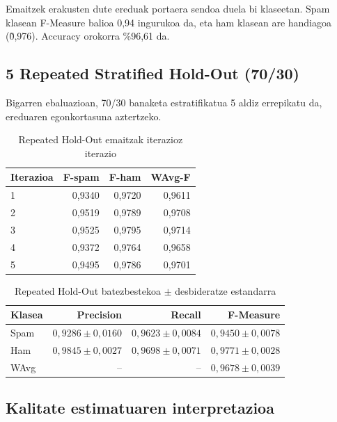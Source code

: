 \documentclass[12pt, a4paper]{article}
\begin{document}
Emaitzek erakusten dute ereduak portaera sendoa duela bi klaseetan.
Spam klasean F-Measure balioa 0,94 ingurukoa da, eta ham klasean
are handiagoa (\~0,976). Accuracy orokorra \%96,61 da.

\subsection{5 Repeated Stratified Hold-Out (70/30)}

Bigarren ebaluazioan, 70/30 banaketa estratifikatua 5 aldiz errepikatu da,
ereduaren egonkortasuna aztertzeko.

\begin{table}[H]
    \centering
    \caption{Repeated Hold-Out emaitzak iterazioz iterazio}
    \begin{tabular}{lrrr}
        \toprule
        \textbf{Iterazioa} & \textbf{F-spam} & \textbf{F-ham} & \textbf{WAvg-F} \\
        \midrule
        1 & 0,9340 & 0,9720 & 0,9611 \\
        2 & 0,9519 & 0,9789 & 0,9708 \\
        3 & 0,9525 & 0,9795 & 0,9714 \\
        4 & 0,9372 & 0,9764 & 0,9658 \\
        5 & 0,9495 & 0,9786 & 0,9701 \\
        \bottomrule
    \end{tabular}
\end{table}

\begin{table}[H]
    \centering
    \caption{Repeated Hold-Out batezbestekoa $\pm$ desbideratze estandarra}
    \begin{tabular}{lrrr}
        \toprule
        \textbf{Klasea} & \textbf{Precision} & \textbf{Recall} & \textbf{F-Measure} \\
        \midrule
        Spam & $0{,}9286 \pm 0{,}0160$ & $0{,}9623 \pm 0{,}0084$ & $0{,}9450 \pm 0{,}0078$ \\
        Ham  & $0{,}9845 \pm 0{,}0027$ & $0{,}9698 \pm 0{,}0071$ & $0{,}9771 \pm 0{,}0028$ \\
        WAvg & --                       & --                       & $0{,}9678 \pm 0{,}0039$ \\
        \bottomrule
    \end{tabular}
\end{table}

\subsection{Kalitate estimatuaren interpretazioa}
\end{document}
